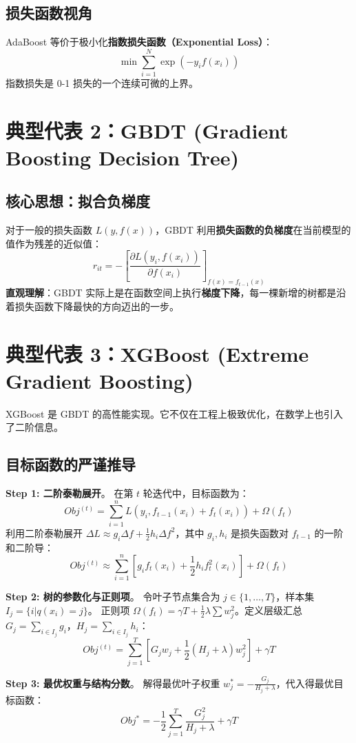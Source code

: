 \documentclass[12pt, a4paper]{article}
\begin{document}
\subsection{损失函数视角}
AdaBoost 等价于极小化\textbf{指数损失函数（Exponential Loss）}：
$$ \min \sum_{i=1}^N \exp(-y_i f(x_i)) $$
指数损失是 0-1 损失的一个连续可微的上界。

\section{典型代表 2：GBDT (Gradient Boosting Decision Tree)}

\subsection{核心思想：拟合负梯度}
对于一般的损失函数 $L(y, f(x))$，GBDT 利用\textbf{损失函数的负梯度}在当前模型的值作为残差的近似值：
$$ r_{it} = - \left[ \frac{\partial L(y_i, f(x_i))}{\partial f(x_i)} \right]_{f(x) = f_{t-1}(x)} $$
\textbf{直观理解}：GBDT 实际上是在函数空间上执行\textbf{梯度下降}，每一棵新增的树都是沿着损失函数下降最快的方向迈出的一步。

\section{典型代表 3：XGBoost (Extreme Gradient Boosting)}
XGBoost 是 GBDT 的高性能实现。它不仅在工程上极致优化，在数学上也引入了二阶信息。

\subsection{目标函数的严谨推导}
\textbf{Step 1: 二阶泰勒展开}。
在第 $t$ 轮迭代中，目标函数为：
$$ Obj^{(t)} = \sum_{i=1}^n L(y_i, f_{t-1}(x_i) + f_t(x_i)) + \Omega(f_t) $$
利用二阶泰勒展开 $\Delta L \approx g_i \Delta f + \frac{1}{2} h_i \Delta f^2$，其中 $g_i, h_i$ 是损失函数对 $f_{t-1}$ 的一阶和二阶导：
$$ Obj^{(t)} \approx \sum_{i=1}^n [g_i f_t(x_i) + \frac{1}{2} h_i f_t^2(x_i)] + \Omega(f_t) $$

\textbf{Step 2: 树的参数化与正则项}。
令叶子节点集合为 $j \in \{1,\dots,T\}$，样本集 $I_j = \{i | q(x_i)=j\}$。
正则项 $\Omega(f_t) = \gamma T + \frac{1}{2} \lambda \sum w_j^2$。定义层级汇总 $G_j = \sum_{i \in I_j} g_i$，$H_j = \sum_{i \in I_j} h_i$：
$$ Obj^{(t)} = \sum_{j=1}^T [G_j w_j + \frac{1}{2}(H_j + \lambda) w_j^2] + \gamma T $$

\textbf{Step 3: 最优权重与结构分数}。
解得最优叶子权重 $w_j^* = -\frac{G_j}{H_j + \lambda}$，代入得最优目标函数：
$$ Obj^* = -\frac{1}{2} \sum_{j=1}^T \frac{G_j^2}{H_j + \lambda} + \gamma T $$
\end{document}
